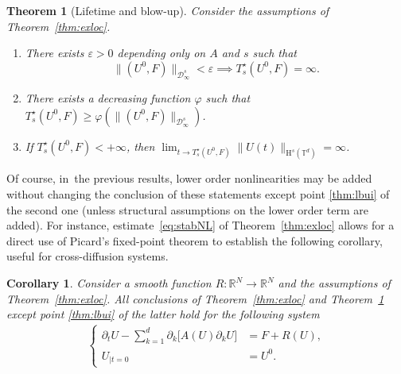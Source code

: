 \documentclass[10pt]{amsart}
\newenvironment{enumeratei}
{\bgroup\def\theenumi{\roman{enumi}}\def\theenumii{\arabic{enumii}}\begin{enumerate}}
{\end{enumerate}\egroup}
\newtheorem{thm}{Theorem}
\newtheorem{coro}[prop]{Corollary}
\theoremstyle{definition}
\newcommand\R{\mathbb{R}}
\newcommand\T{\mathbb{T}}
\renewcommand\H{\mathrm{H}}
\let\ep\varepsilon
\let\ffi\varphi
\begin{document}
\begin{thm}[Lifetime and blow-up] \label{thm:lbu}
Consider the assumptions of Theorem~\ref{thm:exloc}.
\begin{enumeratei}
\item\label{thm:lbui}
There exists $\ep>0$ depending only on $A$ and $s$ such that
\[
\|(U^0,F)\|_{ \mathcal D_\infty^s} < \ep \implies T_s^\star(U^0,F) = \infty.
\]

\item\label{thm:lbuii}
There exists a decreasing function $\ffi$ such that $T^\star_s(U^0,F) \geq \ffi(\|(U^0,F)\|_{ \mathcal D_\infty^s})$.

\item\label{thm:lbuiii}
If $T^\star_s(U^0,F)<+\infty$, then $\lim_{t\to T^\star_s(U^0,F)}\|U(t)\|_{\H^s(\T^d)} = \infty$.
\end{enumeratei}
\end{thm}
{Of course, in~the previous results, lower order nonlinearities may be added without changing the conclusion of these statements except point \eqref{thm:lbui} of the second one (unless structural assumptions on the lower order term are added). For instance, estimate~\eqref{eq:stabNL} of Theorem~\ref{thm:exloc} allows for a direct use of Picard's fixed-point theorem to establish the following corollary, useful for cross-diffusion systems.}

\begin{coro}\label{coro:reac}
Consider a smooth function $R:\R^N\to\R^N$ and the assumptions of Theorem~\ref{thm:exloc}. All conclusions of Theorem~\ref{thm:exloc} and Theorem~\ref{thm:lbu} except point \eqref{thm:lbui} of the latter hold for the following system
\begin{align}
\label{eq:PtNL:reac}
\left\{
\begin{aligned}
\partial_t U-\sum_{k=1}^d\partial_k \bigl[A(U)\partial_k U\bigr] &= F+R(U),\\
U_{|t=0} &= U^0.
\end{aligned}
\right.
\end{align}
\end{coro}
\end{document}
